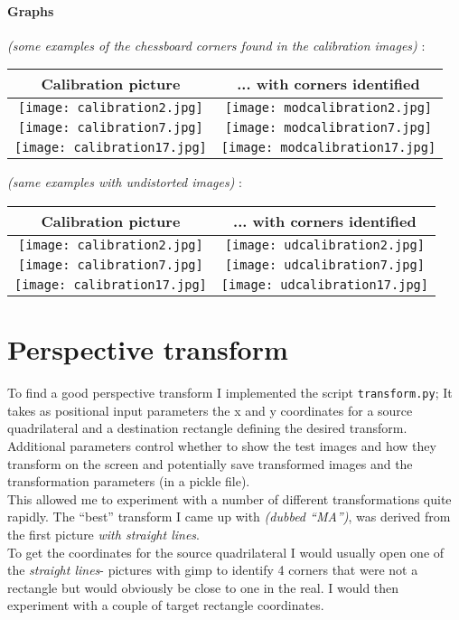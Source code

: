 \documentclass[a4paper]{article}
\begin{document}
\paragraph{Graphs}
\textit{(some examples of the chessboard corners found in the calibration images)}
:\\
\begin{tabular}{ |c|c| }
  \hline
  Calibration picture & ... with corners identified \\
  \hline
  \texttt{[image: calibration2.jpg]} & \texttt{[image: modcalibration2.jpg]} \\
  \hline
  \texttt{[image: calibration7.jpg]} & \texttt{[image: modcalibration7.jpg]} \\
  \hline
  \texttt{[image: calibration17.jpg]} & \texttt{[image: modcalibration17.jpg]} \\
  \hline
\end{tabular}

\textit{(same examples with undistorted images)}
:\\
\begin{tabular}{ |c|c| }
  \hline
  Calibration picture & ... with corners identified \\
  \hline
  \texttt{[image: calibration2.jpg]} & \texttt{[image: udcalibration2.jpg]} \\
  \hline
  \texttt{[image: calibration7.jpg]} & \texttt{[image: udcalibration7.jpg]} \\
  \hline
  \texttt{[image: calibration17.jpg]} & \texttt{[image: udcalibration17.jpg]} \\
  \hline
\end{tabular}

\section{Perspective transform}
To find a good perspective transform I implemented the script \texttt{transform.py};
It takes as positional input parameters the x and y coordinates for a source quadrilateral
and a destination rectangle defining the desired transform.
\\
Additional parameters control whether to show the test images and how they transform
on the screen and potentially save transformed images and the transformation
parameters (in a pickle file).
\\
This allowed me to experiment with a number of different transformations quite rapidly.
The \enquote{best} transform I came up with \textit{(dubbed \enquote{MA})}, was derived
from the first picture \textit{with straight lines}.
\\
To get the coordinates for the source quadrilateral I would usually open one of
the \textit{straight lines}- pictures with gimp to identify 4 corners that were
not a rectangle but would obviously be close to one in the real. I would then
experiment with a couple of target rectangle coordinates.
\end{document}
